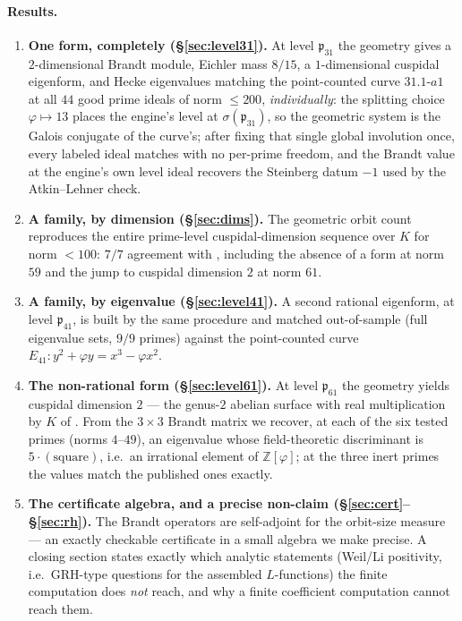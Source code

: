 \documentclass[11pt,a4paper]{article}
\newcommand{\Z}{\mathbb{Z}}
\newcommand{\fp}{\mathfrak{p}}
\begin{document}
\paragraph{Results.}
\begin{enumerate}[leftmargin=2em]
\item \textbf{One form, completely (\S\ref{sec:level31}).} At level
$\fp_{31}$ the geometry gives a $2$-dimensional Brandt module, Eichler
mass $8/15$, a $1$-dimensional cuspidal eigenform, and Hecke
eigenvalues matching the point-counted curve $31.1\text{-}a1$ at all
$44$ good prime ideals of norm ${\le}200$, \emph{individually}: the
splitting choice $\varphi\mapsto13$ places the engine's level at
$\sigma(\fp_{31})$, so the geometric system is the Galois conjugate of
the curve's; after fixing that single global involution once, every
labeled ideal matches with no per-prime freedom, and the Brandt value
at the engine's own level ideal recovers the Steinberg datum $-1$ used
by the Atkin--Lehner check.
\item \textbf{A family, by dimension (\S\ref{sec:dims}).} The geometric
orbit count reproduces the entire prime-level cuspidal-dimension
sequence over $K$ for norm ${<}100$: $7/7$ agreement with
\cite{Dembele2005}, including the absence of a form at norm $59$ and
the jump to cuspidal dimension $2$ at norm $61$.
\item \textbf{A family, by eigenvalue (\S\ref{sec:level41}).} A second
rational eigenform, at level $\fp_{41}$, is built by the same procedure
and matched out-of-sample (full eigenvalue sets, $9/9$ primes) against
the point-counted curve $E_{41}:y^2+\varphi y=x^3-\varphi x^2$.
\item \textbf{The non-rational form (\S\ref{sec:level61}).} At level
$\fp_{61}$ the geometry yields cuspidal dimension $2$ --- the
genus-$2$ abelian surface with real multiplication by $K$ of
\cite[Rem.~4.4]{Dembele2005}. From the $3\times3$ Brandt matrix we
recover, at each of the six tested primes (norms $4$--$49$), an
eigenvalue whose field-theoretic discriminant is
$5\cdot(\text{square})$, i.e.\ an irrational element of $\Z[\varphi]$;
at the three inert primes the values match the published ones exactly.
\item \textbf{The certificate algebra, and a precise non-claim
(\S\ref{sec:cert}--\S\ref{sec:rh}).} The Brandt operators are
self-adjoint for the orbit-size measure --- an exactly checkable
certificate in a small algebra we make precise. A closing section
states exactly which analytic statements (Weil/Li positivity, i.e.\
GRH-type questions for the assembled $L$-functions) the finite
computation does \emph{not} reach, and why a finite coefficient
computation cannot reach them.
\end{enumerate}
\end{document}
